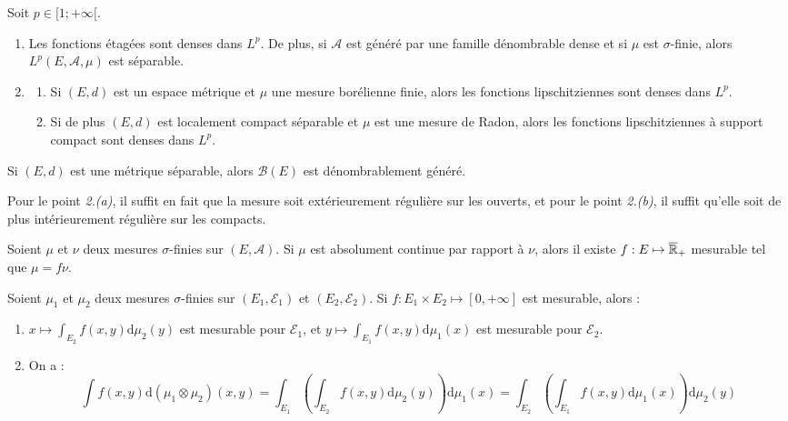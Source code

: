 \documentclass[11pt,a4paper]{article}
\begin{document}
\begin{thm}[Densité]
Soit $p \in [1;+\infty[$.
\begin{enumerate}
\item Les fonctions étagées sont denses dans $L^p$. De plus, si $\mathcal{A}$ est généré par une famille dénombrable dense et si $\mu$ est $\sigma$-finie, alors $L^p(E,\mathcal{A}, \mu)$ est séparable.
\item 
\begin{enumerate}
\item Si $(E,d)$ est un espace métrique et $\mu$ une mesure borélienne finie, alors les fonctions lipschitziennes sont denses dans $L^p$.
\item Si de plus $(E,d)$ est localement compact séparable et $\mu$ est une mesure de Radon, alors les fonctions lipschitziennes à support compact sont denses dans $L^p$.
\end{enumerate}
\end{enumerate}
\end{thm}

\begin{rmq}
Si  $(E,d)$ est une métrique séparable, alors $\mathcal{B}(E)$ est dénombrablement généré.
\end{rmq}

\begin{rmq}
Pour le point \textit{2.(a)}, il suffit en fait que la mesure soit extérieurement régulière sur les ouverts, et pour le point \textit{2.(b)}, il suffit qu'elle soit de plus intérieurement régulière sur les compacts.
\end{rmq}


\begin{thm}
Soient $\mu$ et $\nu$ deux mesures $\sigma$-finies sur $(E,\mathcal{A})$. Si $\mu$ est absolument continue par rapport à $\nu$, alors il existe $f : E \mapsto \overline{\mathbb R}_+$ mesurable tel que $\mu=f\nu$.
\end{thm}


\begin{thm}
Soient $\mu_1$ et $\mu_2$ deux mesures $\sigma$-finies sur $(E_1,\mathcal{E}_1)$ et $(E_2,\mathcal{E}_2)$. Si $f : E_1 \times E_2 \mapsto [0,+\infty]$ est mesurable, alors : 
\begin{enumerate}
\item $\displaystyle x\mapsto \int_{E_2} f(x,y) \mathrm{d}\mu_2(y)$ est mesurable pour $\mathcal{E}_1$, et $\displaystyle y\mapsto \int_{E_1} f(x,y) \mathrm{d}\mu_1(x)$ est mesurable pour $\mathcal{E}_2$. 
\item On a :
\[\int f(x,y)\mathrm{d}(\mu_1 \otimes \mu_2)(x,y)=\int_{E_1}\left(\int_{E_2} f(x,y) \mathrm{d}\mu_2(y)\right)\mathrm{d}\mu_1(x)=\int_{E_2}\left(\int_{E_1} f(x,y) \mathrm{d}\mu_1(x)\right)\mathrm{d}\mu_2(y) \]
\end{enumerate}
\end{thm}
\end{document}
